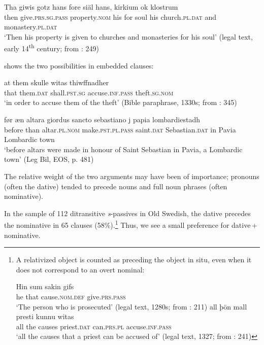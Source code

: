 \documentclass[output=paper]{langscibook}
\begin{document}
\ex \label{ex:falk:15b}
\gll Tha  giwis          gotz        hans  fore  siäl  hans,  kirkium ok    klostrum\\
    then  give.\textsc{prs.sg.pass}  property.\textsc{nom}  his    for    soul  his    church.\textsc{pl.dat}   and  monastery.\textsc{pl.dat}\\
\glt ‘Then his property is given to churches and monasteries for his soul’ (legal text, early 14\textsuperscript{th} century; from \citealt{Holm1952}: 249)
\z
\z

          shows the two possibilities in embedded clauses:

\ea%
    \label{ex:falk:16}

\ea
\gll at    them    skulle        witas            thiwffnadher\\
      that  them.\textsc{dat}  shall.\textsc{pst.sg}  accuse.\textsc{inf.pass}    theft.\textsc{sg.nom}\\
\glt ‘in order to accuse them of the theft’ (Bible paraphrase, 1330s; from \citealt{Holm1952}: 345)

\ex
\gll før      æn    altara        giordus          sancto      sebastiano j  papia   lombardiestadh\\
      before  than     altar\textsc{.pl.nom}  make.\textsc{pst.pl.pass}  saint.\textsc{dat}  Sebastian.\textsc{dat}       in Pavia    {Lombardic    town}\\
\glt ‘before altars were made in honour of Saint Sebastian in Pavia, a Lombardic town’ (Leg Bil, EOS, p. 481)
\z
\z


The relative weight of the two arguments may have been of importance; pronouns (often the dative) tended to precede nouns and full noun phrases (often nominative).  


In the sample of 112 ditransitive \textit{s}{}-passives in Old Swedish, the dative precedes the nominative in 65 clauses (58\%).\footnote{A relativized object is counted as preceding the object in situ, even when it does not correspond to an overt nominal:\label{fn:02:13}

\ea \gll Hin  sum  sakin          gifs\\
         he    that  cause.\textsc{nom.def}  give.\textsc{prs.pass}\\
    \glt ‘The person who is prosecuted’ (legal text, 1280s; from \citealt{Holm1952}: 211)
\ex \gll all    þön   mall  presti      kunnu  witas\\
         all    the    causes  priest.\textsc{dat}    can.\textsc{prs.pl}  accuse.\textsc{inf.pass}\\
    \glt ‘all the causes that a priest can be accused of’ (legal text, 1327; from \citealt{Holm1952}: 241)
\z} Thus, we see a small preference for dative\,+\,nominative.
\end{document}
